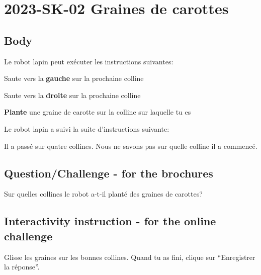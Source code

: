 \documentclass[a4paper,11pt]{report}
\newcommand{\taskGraphicsFolder}{..}
\begin{document}
\section*{\centering{} 2023-SK-02 Graines de carottes}


\subsection*{Body}

Le robot lapin peut exécuter les instructions suivantes:

\raisebox{-0.5ex}{} Saute vers la \textbf{gauche} sur la prochaine colline

\raisebox{-0.5ex}{} Saute vers la \textbf{droite} sur la prochaine colline

\raisebox{-0.5ex}{} \textbf{Plante} une graine de carotte sur la colline sur laquelle tu es

Le robot lapin a suivi la suite d’instructions suivante:

{\centering%
\par}

Il a passé sur quatre collines. Nous ne savons pas sur quelle colline il a commencé.

{\em


\subsection*{Question/Challenge - for the brochures}

Sur quelles collines le robot a-t-il planté des graines de carottes?

{\centering%
\par}

}


\subsection*{Interactivity instruction - for the online challenge}

Glisse les graines sur les bonnes collines. Quand tu as fini, clique sur “Enregistrer la réponse”.
\end{document}
